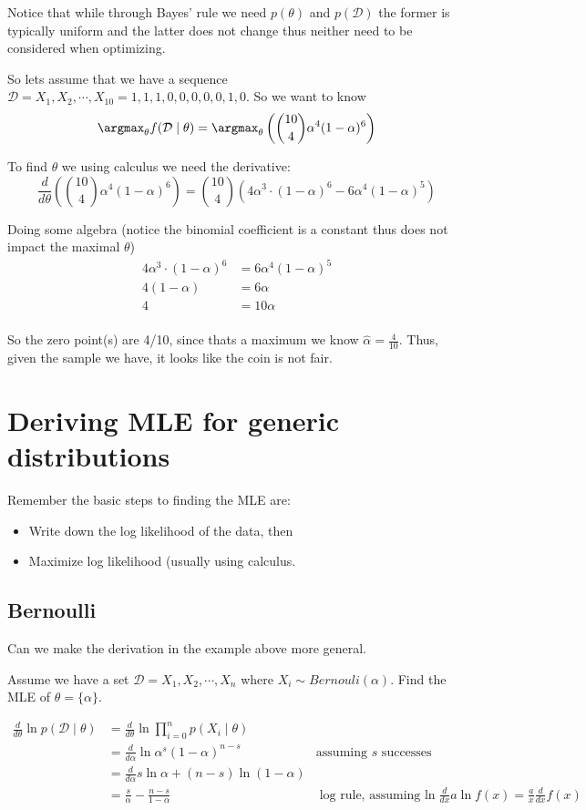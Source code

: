 Notice that while through Bayes' rule we need $p(\theta)$ and $p(\mathcal{D})$ 
the former is typically uniform and the latter does not change thus neither need to be considered when optimizing. 

So lets assume that we have a sequence $\mathcal{D} = X_1, X_2, \cdots, X_{10} = 1,1,1,0,0,0,0,0,1,0$.
So we want to know 
\[\argmax_\theta f(\mathcal{D}\mid\theta) = \argmax_\theta \left({10 \choose 4} \alpha^4(1-\alpha)^6\right)\]

To find $\theta$ we using calculus we need the derivative: 
\[\frac{d}{d\theta}\left({10 \choose 4} \alpha^4(1-\alpha)^6\right) = {10 \choose 4}\left(4\alpha^3\cdot(1-\alpha)^6-6\alpha^4(1-\alpha)^5\right)\]

Doing some algebra (notice the binomial coefficient is a constant thus does not impact the maximal $\theta$)
\begin{align*}
4\alpha^3\cdot(1-\alpha)^6&=6\alpha^4(1-\alpha)^5\\
4(1-\alpha) &= 6\alpha\\
4 &= 10\alpha\\
\end{align*}

So the zero point(s) are 4/10, since thats a maximum we know $\hat{\alpha} = \frac{4}{10}$.
Thus, given the sample we have, it looks like the coin is not fair. 

\section{Deriving MLE for generic distributions}
Remember the basic steps to finding the MLE are: 
\begin{itemize}
\item Write down the log likelihood of the data, then
\item Maximize log likelihood (usually using calculus. 
\end{itemize}

\subsection{Bernoulli}

Can we make the derivation in the example above more general. 

Assume we have a set $\mathcal{D} = X_1, X_2, \cdots, X_n$ 
where $X_i \sim Bernouli(\alpha)$.
Find the MLE of $\theta=\{\alpha\}$.

\begin{align*}
\frac{d}{d\theta} \ln p(\mathcal{D}\mid\theta) 	&= \frac{d}{d\theta} \ln \prod_{i=0}^n p(X_i\mid\theta)\\
					    		     	&= \frac{d}{d\alpha} \ln \alpha^s(1-\alpha)^{n-s} & \text{assuming $s$ successes}\\
					    			& = \frac{d}{d\alpha} s \ln \alpha + (n-s) \ln (1-\alpha)\\
								& = \frac{s}{\alpha} - \frac{n-s}{1-\alpha} 		& \text{log rule, assuming $\ln$} \frac{d}{dx} a \ln f(x) = \frac{a}{x} \frac{d}{dx}  f(x)			     
\end{align*}

